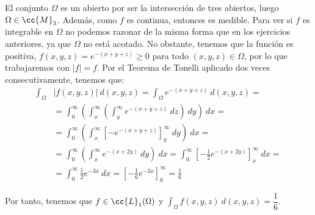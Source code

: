 \begin{ejercicio}
\begin{enumerate}
        El conjunto $\Omega$ es un abierto por ser la intersección de tres abiertos, luego $\Omega\in \cc{M}_3$. Además, como $f$ es continua, entonces
        es medible. Para ver si $f$ es integrable en $\Omega$ no podemos razonar de la misma forma que
        en los ejercicios anteriores, ya que $\Omega$ no está acotado. No obstante, tenemos que
        la función es positiva, $f(x,y,z)=e^{-(x+y+z)}\geq 0$ para todo $(x,y,z)\in \Omega$, por lo que trabajaremos con $|f|=f$.
        Por el Teorema de Tonelli aplicado dos veces consecutivamente, tenemos que:
        \begin{align*}
            \int_{\Omega} &|f(x, y, z)|~d(x, y, z)
            = \int_{\Omega} e^{-(x+y+z)}~d(x, y, z)
            =\\&= \int_{0}^{\infty} \left( \int_{x}^{\infty} \left( \int_{y}^{\infty} e^{-(x+y+z)}~dz \right)~dy \right)~dx
            =\\&= \int_{0}^{\infty} \left( \int_{x}^{\infty} \left[ -e^{-(x+y+z)} \right]_{y}^{\infty}~dy \right)~dx
            =\\&= \int_{0}^{\infty} \left( \int_{x}^{\infty} e^{-(x+2y)}~dy \right)~dx
            = \int_{0}^{\infty} \left[ -\frac{1}{2}e^{-(x+2y)} \right]_{x}^{\infty}~dx
            =\\&= \int_{0}^{\infty} \frac{1}{2}e^{-3x} ~dx
            = \left[ -\frac{1}{6}e^{-3x} \right]_{0}^{\infty}
            = \frac{1}{6}
        \end{align*}

        Por tanto, tenemos que $f\in \cc{L}_1(\Omega)$ y $\displaystyle \int_{\Omega} f(x, y, z)~d(x, y, z) = \dfrac{1}{6}$.
    \end{enumerate}

\end{ejercicio}

